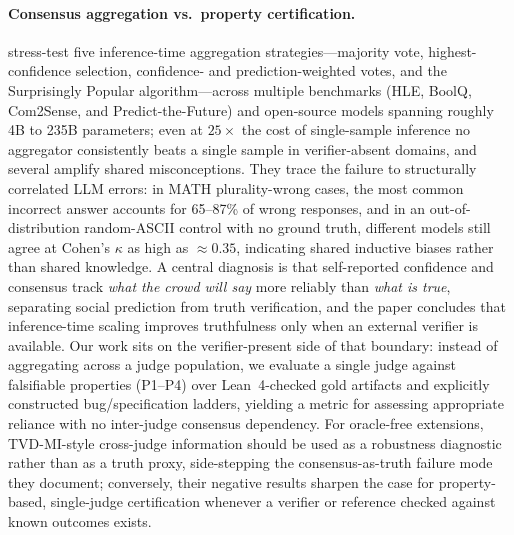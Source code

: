 \documentclass{article}
\begin{document}
\paragraph{Consensus aggregation vs.\ property certification.}
\citet{denisovblanch2026consensus} stress-test five inference-time aggregation strategies---majority vote, highest-confidence selection, confidence- and prediction-weighted votes, and the Surprisingly Popular algorithm---across multiple benchmarks (HLE, BoolQ, Com2Sense, and Predict-the-Future) and open-source models spanning roughly 4B to 235B parameters; even at $25\times$ the cost of single-sample inference no aggregator consistently beats a single sample in verifier-absent domains, and several amplify shared misconceptions.
They trace the failure to structurally correlated LLM errors: in MATH plurality-wrong cases, the most common incorrect answer accounts for 65--87\% of wrong responses, and in an out-of-distribution random-ASCII control with no ground truth, different models still agree at Cohen's $\kappa$ as high as ${\approx}0.35$, indicating shared inductive biases rather than shared knowledge.
A central diagnosis is that self-reported confidence and consensus track \emph{what the crowd will say} more reliably than \emph{what is true}, separating social prediction from truth verification, and the paper concludes that inference-time scaling improves truthfulness only when an external verifier is available.
Our work sits on the verifier-present side of that boundary: instead of aggregating across a judge population, we evaluate a single judge against falsifiable properties (P1--P4) over Lean~4-checked gold artifacts and explicitly constructed bug/specification ladders, yielding a metric for assessing appropriate reliance with no inter-judge consensus dependency.
For oracle-free extensions, TVD-MI-style cross-judge information should be used as a robustness diagnostic rather than as a truth proxy, side-stepping the consensus-as-truth failure mode they document; conversely, their negative results sharpen the case for property-based, single-judge certification whenever a verifier or reference checked against known outcomes exists.
\end{document}
